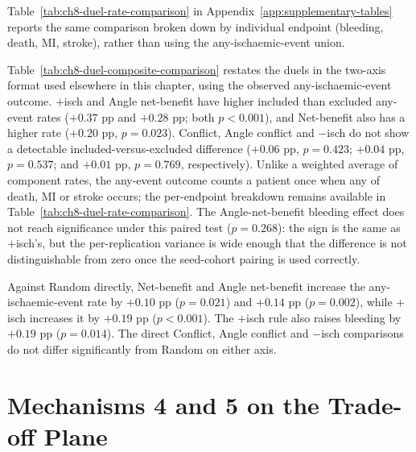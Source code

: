 \begin{table}[htbp]
    \centering
    \small
    \setlength{\tabcolsep}{4pt}
    
    \caption{Direct comparison of the post-seed duel winners selected by each Mechanism~3
    rule with the post-seed winners selected by Random, paired by run over 100 seeded
    replications. Differences are policy minus Random; SEM and the two-sided Wilcoxon test
    use the paired per-run differences.}
    \label{tab:ch8-mechanism3-vs-random}
\end{table}

Table~\ref{tab:ch8-duel-rate-comparison} in Appendix~\ref{app:supplementary-tables}
reports the same comparison broken down by individual endpoint (bleeding, death, MI,
stroke), rather than using the any-ischaemic-event union.

\vspace{10pt}

Table~\ref{tab:ch8-duel-composite-comparison} restates the duels in the two-axis
format used elsewhere in this chapter, using the observed any-ischaemic-event outcome.
$+$isch and Angle net-benefit have higher included than excluded any-event rates
($+0.37$ pp and $+0.28$ pp; both $p<0.001$), and Net-benefit also has a higher rate
($+0.20$ pp, $p=0.023$). Conflict, Angle conflict and $-$isch do not show a detectable
included-versus-excluded difference ($+0.06$ pp, $p=0.423$; $+0.04$ pp, $p=0.537$;
and $+0.01$ pp, $p=0.769$, respectively). Unlike a weighted average of component rates,
the any-event outcome counts a patient once when any of death, MI or stroke occurs; the
per-endpoint breakdown remains available in
Table~\ref{tab:ch8-duel-rate-comparison}. The Angle-net-benefit bleeding effect does not
reach significance under this paired test ($p=0.268$): the sign is the same as
$+$isch's, but the per-replication variance is wide enough that the difference is not
distinguishable from zero once the seed-cohort pairing is used correctly.

Against Random directly, Net-benefit and Angle net-benefit increase the any-ischaemic-event
rate by $+0.10$ pp ($p=0.021$) and $+0.14$ pp ($p=0.002$), while $+$isch increases it by
$+0.19$ pp ($p<0.001$). The $+$isch rule also raises bleeding by $+0.19$ pp ($p=0.014$).
The direct Conflict, Angle conflict and $-$isch comparisons do not differ significantly
from Random on either axis.

\section{Mechanisms 4 and 5 on the Trade-off Plane}

